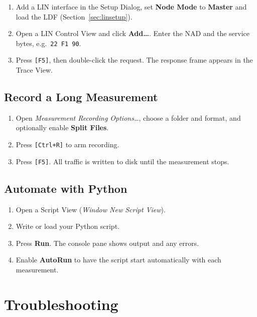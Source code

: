 \documentclass[a4paper,11pt]{article}
\newcommand{\key}[1]{\texttt{\small[#1]}}
\newcommand{\menu}[1]{\textit{#1}}
\newcommand{\ui}[1]{\textbf{#1}}
\begin{document}
\begin{enumerate}
  \item Add a LIN interface in the Setup Dialog, set \ui{Node Mode} to \ui{Master}
        and load the LDF (Section~\ref{sec:linsetup}).
  \item Open a LIN Control View and click \ui{Add\ldots}. Enter the NAD and the
        service bytes, e.g.\ \texttt{22 F1 90}.
  \item Press \key{F5}, then double-click the request. The response frame appears
        in the Trace View.
\end{enumerate}

\subsection{Record a Long Measurement}

\begin{enumerate}
  \item Open \menu{Measurement \textrightarrow{} Recording Options\ldots}, choose a
        folder and format, and optionally enable \ui{Split Files}.
  \item Press \key{Ctrl+R} to arm recording.
  \item Press \key{F5}. All traffic is written to disk until the measurement stops.
\end{enumerate}

\subsection{Automate with Python}

\begin{enumerate}
  \item Open a Script View (\menu{Window \textrightarrow{} New \textrightarrow{} Script View}).
  \item Write or load your Python script.
  \item Press \ui{Run}. The console pane shows output and any errors.
  \item Enable \ui{AutoRun} to have the script start automatically with each
        measurement.
\end{enumerate}

\section{Troubleshooting}
\end{document}
